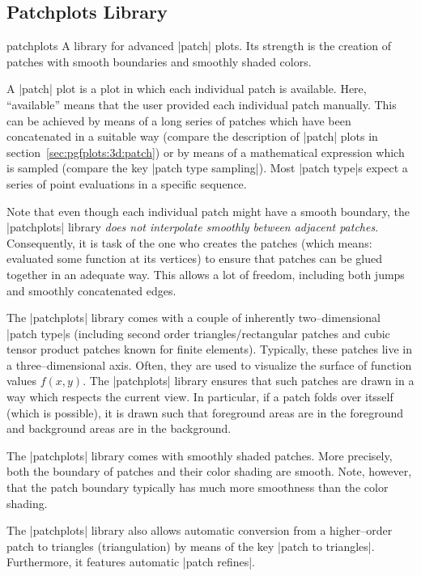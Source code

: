\subsection{Patchplots Library}
{
%
\label{sec:lib:patchplots}
\begin{pgfplotslibrary}{patchplots}
	A library for advanced |patch| plots. Its strength is the creation of patches with smooth boundaries and smoothly shaded colors.
	
	A |patch| plot is a plot in which each individual patch is available. Here, ``available'' means that the user provided each individual patch manually. This can be achieved by means of a long series of patches which have been concatenated in a suitable way (compare the description of |patch| plots in section~\ref{sec:pgfplots:3d:patch}) or by means of a mathematical expression which is sampled (compare the key |patch type sampling|). Most |patch type|s expect a series of point evaluations in a specific sequence.
	
	Note that even though each individual patch might have a smooth boundary, the |patchplots| library \emph{does not interpolate smoothly between adjacent patches}. Consequently, it is task of the one who creates the patches (which means: evaluated some function at its vertices) to ensure that patches can be glued together in an adequate way. This allows a lot of freedom, including both jumps and smoothly concatenated edges. 

	The |patchplots| library comes with a couple of inherently two--dimensional |patch type|s (including second order triangles/rectangular patches and cubic tensor product patches known for finite elements). Typically, these patches live in a three--dimensional axis. Often, they are used to visualize the surface of function values $f(x,y)$. The |patchplots| library ensures that such patches are drawn in a way which respects the current view. In particular, if a patch folds over itsself (which is possible), it is drawn such that foreground areas are in the foreground and background areas are in the background.

	The |patchplots| library comes with smoothly shaded patches. More precisely, both the boundary of patches and their color shading are smooth. Note, however, that the patch boundary typically has much more smoothness than the color shading. 

	The |patchplots| library also allows automatic conversion from a higher--order patch to triangles (triangulation) by means of the key |patch to triangles|. Furthermore, it features automatic |patch refines|.


\end{pgfplotslibrary}}
